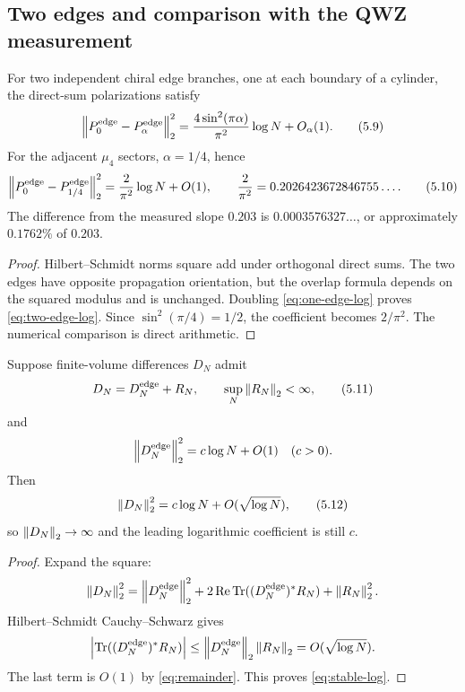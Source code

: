 \subsection{Two edges and comparison with the QWZ measurement}

\begin{corollary}\label{cor:twoedge}
For two independent chiral edge branches, one at each boundary of a
cylinder, the direct-sum polarizations satisfy
\[
 \left\lVert P_0^{\mathrm{edge}}-P_\alpha^{\mathrm{edge}}\right\rVert_2^2
 =\frac{4\sin^2(\pi\alpha)}{\pi^2}\log N+O_\alpha(1).
\tag{5.9}\label{eq:two-edge-log}
\]
For the adjacent $\mu_4$ sectors, $\alpha=1/4$, hence
\[
 \left\lVert P_0^{\mathrm{edge}}-P_{1/4}^{\mathrm{edge}}\right\rVert_2^2
 =\frac2{\pi^2}\log N+O(1),
\qquad
\frac2{\pi^2}=0.2026423672846755\ldots .
\tag{5.10}\label{eq:quarter-coefficient}
\]
The difference from the measured slope $0.203$ is
$0.0003576327\ldots$, or approximately $0.1762\%$ of $0.203$.
\end{corollary}

\begin{proof}
Hilbert--Schmidt norms square add under orthogonal direct sums.  The two
edges have opposite propagation orientation, but the overlap formula
depends on the squared modulus and is unchanged.  Doubling
\eqref{eq:one-edge-log} proves \eqref{eq:two-edge-log}.  Since
$\sin^2(\pi/4)=1/2$, the coefficient becomes $2/\pi^2$.  The numerical
comparison is direct arithmetic.
\end{proof}

\begin{lemma}
\label{lem:stability}
Suppose finite-volume differences $D_N$ admit
\[
 D_N=D_N^{\mathrm{edge}}+R_N,\qquad
 \sup_N\left\lVert R_N\right\rVert_2<\infty,
\tag{5.11}\label{eq:remainder}
\]
and
\[
 \left\lVert D_N^{\mathrm{edge}}\right\rVert_2^2=c\log N+O(1)
\quad(c>0).
\]
Then
\[
 \left\lVert D_N\right\rVert_2^2=c\log N+O(\sqrt{\log N}),
\tag{5.12}\label{eq:stable-log}
\]
so $\left\lVert D_N\right\rVert_2\to\infty$ and the leading logarithmic coefficient is
still $c$.
\end{lemma}

\begin{proof}
Expand the square:
\[
 \left\lVert D_N\right\rVert_2^2
 =\left\lVert D_N^{\mathrm{edge}}\right\rVert_2^2
 +2\operatorname{Re}\operatorname{Tr}((D_N^{\mathrm{edge}})^*R_N)
 +\left\lVert R_N\right\rVert_2^2.
\]
Hilbert--Schmidt Cauchy--Schwarz gives
\[
 \left|\operatorname{Tr}((D_N^{\mathrm{edge}})^*R_N)\right|
 \le\left\lVert D_N^{\mathrm{edge}}\right\rVert_2\left\lVert R_N\right\rVert_2
 =O(\sqrt{\log N}).
\]
The last term is $O(1)$ by \eqref{eq:remainder}.  This proves
\eqref{eq:stable-log}.
\end{proof}

